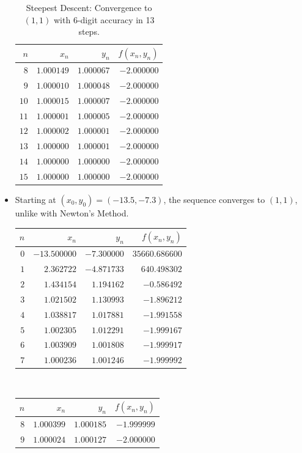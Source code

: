 \begin{example}
\begin{itemize}
\begin{table}[ht!]
\begin{tabular}{|r|r|r|r|}
	$n$ & $x_n$ & $y_n$ & $f(x_n,y_n)$ \\ \hline \hline 
	$8$ & $1.000149$ & $1.000067$ & $-2.000000$ \\ \hline 
	$9$ & $1.000010$ & $1.000048$ & $-2.000000$ \\ \hline 
	$10$ & $1.000015$ & $1.000007$ & $-2.000000$ \\ \hline 
	$11$ & $1.000001$ & $1.000005$ & $-2.000000$ \\ \hline 
	$12$ & $1.000002$ & $1.000001$ & $-2.000000$ \\ \hline 
	$13$ & $1.000000$ & $1.000001$ & $-2.000000$ \\ \hline 
	$14$ & $1.000000$ & $1.000000$ & $-2.000000$ \\ \hline 
	$15$ & $1.000000$ & $1.000000$ & $-2.000000$ \\ \hline 
	\end{tabular}
	\caption{Steepest Descent: Convergence to $(1,1)$ with 6-digit accuracy in 13 steps.}
	\label{table:SD11}
	\end{table}
	\item Starting at $(x_0, y_0) = (-13.5, -7.3)$, the sequence converges to $(1,1)$, unlike with Newton's Method.
	\begin{table}[ht!]
	\begin{tabular}{|r|r|r|r|} \hline 
	$n$ & $x_n$ & $y_n$ & $f(x_n,y_n)$ \\ \hline \hline 
	$0$ & $-13.500000$ & $-7.300000$ & $35660.686600$ \\ \hline 
	$1$ & $2.362722$ & $-4.871733$ & $640.498302$ \\ \hline 
	$2$ & $1.434154$ & $1.194162$ & $-0.586492$ \\ \hline 
	$3$ & $1.021502$ & $1.130993$ & $-1.896212$ \\ \hline 
	$4$ & $1.038817$ & $1.017881$ & $-1.991558$ \\ \hline 
	$5$ & $1.002305$ & $1.012291$ & $-1.999167$ \\ \hline 
	$6$ & $1.003909$ & $1.001808$ & $-1.999917$ \\ \hline 
	$7$ & $1.000236$ & $1.001246$ & $-1.999992$ \\ \hline 
	\end{tabular}~\begin{tabular}{|r|r|r|r|} \hline 
	$n$ & $x_n$ & $y_n$ & $f(x_n,y_n)$ \\ \hline \hline 
	$8$ & $1.000399$ & $1.000185$ & $-1.999999$ \\ \hline 
	$9$ & $1.000024$ & $1.000127$ & $-2.000000$ \\ \hline 

\end{tabular}
\end{table}
\end{itemize}
\end{example}
